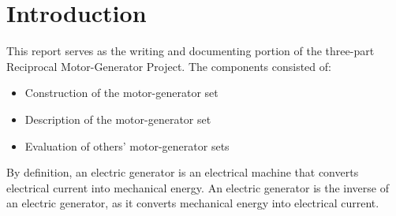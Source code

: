 \newpage
\section{Introduction}
This report serves as the writing and documenting portion of the three-part Reciprocal Motor-Generator Project. The components consisted of:

    \begin{itemize}

        \item Construction of the motor-generator set

        \item Description of the motor-generator set

        \item Evaluation of others' motor-generator sets

    \end{itemize}

    \noindent
    By definition, an electric generator is an electrical machine that converts electrical current into mechanical energy. An electric generator is the inverse of an electric generator, as it converts mechanical energy into electrical current.
